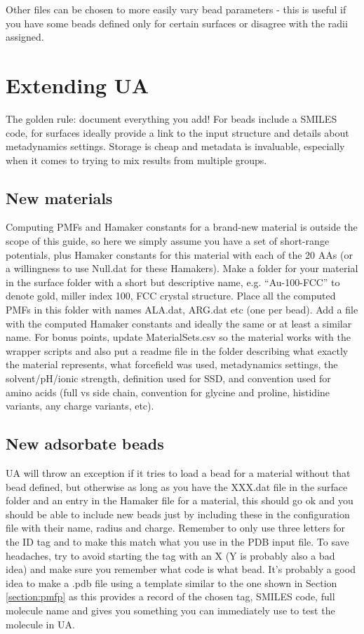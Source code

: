 \documentclass[10pt,a4paper,onecolumn]{report}
\begin{document}
 Other files can be chosen to more easily vary bead parameters - this is useful if you have some beads defined only for certain surfaces or disagree with the radii assigned.


\section{Extending UA}
The golden rule: document everything you add! For beads include a SMILES code, for surfaces ideally provide a link to the input structure and details about metadynamics settings. Storage is cheap and metadata is invaluable, especially when it comes to trying to mix results from multiple groups.

\subsection{New materials}
Computing PMFs and Hamaker constants for a brand-new material is outside the scope of this guide, so here we simply assume you have a set of short-range potentials, plus Hamaker constants for this material with each of the 20 AAs (or a willingness to use Null.dat for these Hamakers). Make a folder for your material in the surface folder with a short but descriptive name, e.g. ``Au-100-FCC'' to denote gold, miller index 100, FCC crystal structure. Place all the computed PMFs in this folder with names ALA.dat, ARG.dat etc (one per bead). Add a file with the computed Hamaker constants and ideally the same or at least a similar name. For bonus points, update MaterialSets.csv so the material works with the wrapper scripts and also put a readme file in the folder describing what exactly the material represents, what forcefield was used, metadynamics settings, the solvent/pH/ionic strength, definition used for SSD, and convention used for amino acids (full vs side chain, convention for glycine and proline, histidine variants, any charge variants, etc). 

\subsection{New adsorbate beads}
UA will throw an exception if it tries to load a bead for a material without that bead defined, but otherwise as long as you have the XXX.dat file in the surface folder and an entry in the Hamaker file for a material, this should go ok and you should be able to include new beads just by including these in the configuration file with their name, radius and charge. Remember to only use three letters for the ID tag and to make this match what you use in the PDB input file. To save headaches, try to avoid starting the tag with an X (Y is probably also a bad idea) and make sure you remember what code is what bead. It's probably a good idea to make a .pdb file using a template similar to the one shown in Section \ref{section:pmfp} as this provides a record of the chosen tag, SMILES code, full molecule name and gives you something you can immediately use to test the molecule in UA. 
\end{document}
